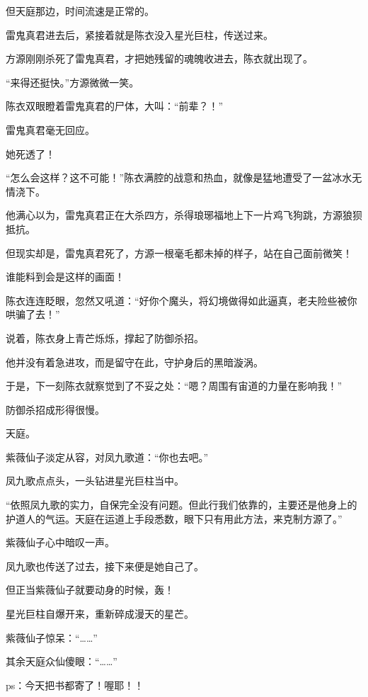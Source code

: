 \begin{this_body}
但天庭那边，时间流速是正常的。

雷鬼真君进去后，紧接着就是陈衣没入星光巨柱，传送过来。

方源刚刚杀死了雷鬼真君，才把她残留的魂魄收进去，陈衣就出现了。

“来得还挺快。”方源微微一笑。

陈衣双眼瞪着雷鬼真君的尸体，大叫：“前辈？！”

雷鬼真君毫无回应。

她死透了！

“怎么会这样？这不可能！”陈衣满腔的战意和热血，就像是猛地遭受了一盆冰水无情浇下。

他满心以为，雷鬼真君正在大杀四方，杀得琅琊福地上下一片鸡飞狗跳，方源狼狈抵抗。

但现实却是，雷鬼真君死了，方源一根毫毛都未掉的样子，站在自己面前微笑！

谁能料到会是这样的画面！

陈衣连连眨眼，忽然又吼道：“好你个魔头，将幻境做得如此逼真，老夫险些被你哄骗了去！”

说着，陈衣身上青芒烁烁，撑起了防御杀招。

他并没有着急进攻，而是留守在此，守护身后的黑暗漩涡。

于是，下一刻陈衣就察觉到了不妥之处：“嗯？周围有宙道的力量在影响我！”

防御杀招成形得很慢。

天庭。

紫薇仙子淡定从容，对凤九歌道：“你也去吧。”

凤九歌点点头，一头钻进星光巨柱当中。

“依照凤九歌的实力，自保完全没有问题。但此行我们依靠的，主要还是他身上的护道人的气运。天庭在运道上手段悉数，眼下只有用此方法，来克制方源了。”

紫薇仙子心中暗叹一声。

凤九歌也传送了过去，接下来便是她自己了。

但正当紫薇仙子就要动身的时候，轰！

星光巨柱自爆开来，重新碎成漫天的星芒。

紫薇仙子惊呆：“……”

其余天庭众仙傻眼：“……”

ps：今天把书都寄了！喔耶！！

\end{this_body}

